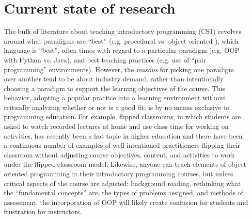 \documentclass[12pt]{article}
\let\textcite=\autocite
\begin{document}

\section*{Current state of research}
The bulk of literature about teaching introductory programming (CS1)
revolves around what paradigms are ``best'' (e.g. procedural
vs. object oriented
\autocite{bailie_objects_2003,moritz_objectsfirst_2005,reges_back_2006}),
which language is ``best'', often times with regard to a particular
paradigm (e.g. OOP with Python
vs. Java\autocite{goldwasser_teaching_2008,koulouri_teaching_2014}),
and best teaching practices (e.g. use of ``pair programming''
environments\autocite{williams_support_2001,mcdowell_effects_2002,thomas_code_2003,chong_social_2007,salleh_empirical_2011}). However,
the \emph{reasons} for picking one paradigm over another tend to be
about industry demand, rather than intentionally choosing a paradigm
to support the learning objectives of the course. This behavior,
adopting a popular practice into a learning environment without
critically analyzing whether or not is a good fit, is by no means
exclusive to programming education. For example, flipped
classrooms\autocite{bishop_flipped_2013}, in which students are asked
to watch recorded lectures at home and use class time for working on
activities, has recently been a hot topic in higher education and
there have been a continuous number of examples of well-intentioned
practitioners flipping their classroom without adjusting course
objectives, content, and activities to work under the
flipped-classroom model\autocite{desantis_students_2015}. Likewise,
anyone can teach elements of object oriented programming in their
introductory programming courses, but unless critical aspects of the
course are adjusted: background reading, rethinking what the
``fundamental concepts'' are, the types of problems assigned, and
methods of assessment, the incorporation of OOP will likely create
confusion for students and frustration for
instructors\autocite{kolling_problem_1999}.
\end{document}
